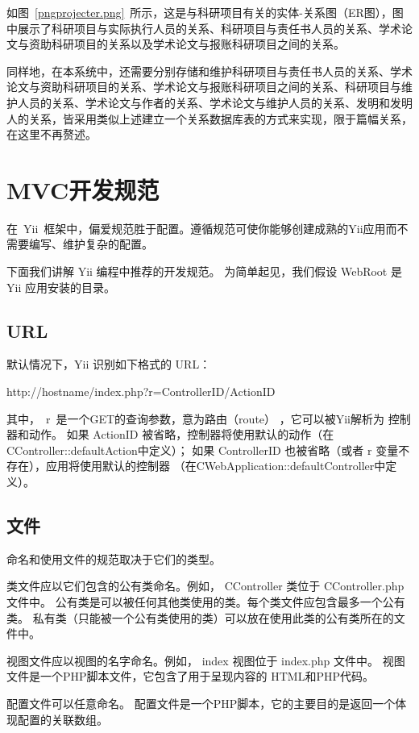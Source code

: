 如图~\ref{pngprojecter.png}~所示，这是与科研项目有关的实体-关系图（ER图），图中展示了科研项目与实际执行人员的关系、科研项目与责任书人员的关系、学术论文与资助科研项目的关系以及学术论文与报账科研项目之间的关系。


同样地，在本系统中，还需要分别存储和维护科研项目与责任书人员的关系、学术论文与资助科研项目的关系、学术论文与报账科研项目之间的关系、科研项目与维护人员的关系、学术论文与作者的关系、学术论文与维护人员的关系、发明和发明人的关系，皆采用类似上述建立一个关系数据库表的方式来实现，限于篇幅关系，在这里不再赘述。

\section{MVC开发规范}
在~Yii~框架中，偏爱规范胜于配置。遵循规范可使你能够创建成熟的Yii应用而不需要编写、维护复杂的配置。 

下面我们讲解 Yii 编程中推荐的开发规范。 为简单起见，我们假设 WebRoot 是 Yii 应用安装的目录。

\subsection{URL}
默认情况下，Yii 识别如下格式的 URL：

http://hostname/index.php?r=ControllerID/ActionID

其中，~r~是一个GET的查询参数，意为路由（route） ，它可以被Yii解析为 控制器和动作。 如果 ActionID 被省略，控制器将使用默认的动作（在CController::defaultAction中定义）； 如果 ControllerID 也被省略（或者 r 变量不存在），应用将使用默认的控制器 （在CWebApplication::defaultController中定义）。

\subsection{文件}

命名和使用文件的规范取决于它们的类型。

类文件应以它们包含的公有类命名。例如， CController 类位于 CController.php 文件中。 公有类是可以被任何其他类使用的类。每个类文件应包含最多一个公有类。 私有类（只能被一个公有类使用的类）可以放在使用此类的公有类所在的文件中。

视图文件应以视图的名字命名。例如， index 视图位于 index.php 文件中。 视图文件是一个PHP脚本文件，它包含了用于呈现内容的 HTML和PHP代码。

配置文件可以任意命名。 配置文件是一个PHP脚本，它的主要目的是返回一个体现配置的关联数组。

